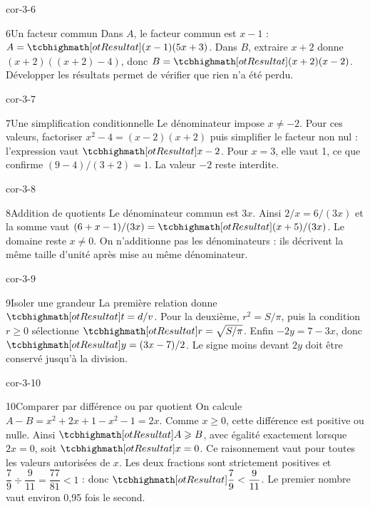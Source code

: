 \begin{blocLivre}{cor-3-6}
\begin{corrige}{6}{Un facteur commun}
Dans $A$, le facteur commun est $x-1$ : $A=\res{(x-1)(5x+3)}$. Dans $B$, extraire $x+2$ donne $(x+2)((x+2)-4)$, donc $B=\res{(x+2)(x-2)}$. Développer les résultats permet de vérifier que rien n’a été perdu.
\end{corrige}
\end{blocLivre}
\begin{blocLivre}{cor-3-7}
\begin{corrige}{7}{Une simplification conditionnelle}
Le dénominateur impose $x\ne-2$. Pour ces valeurs, factoriser $x^2-4=(x-2)(x+2)$ puis simplifier le facteur non nul : l’expression vaut $\res{x-2}$. Pour $x=3$, elle vaut 1, ce que confirme $(9-4)/(3+2)=1$. La valeur $-2$ reste interdite.
\end{corrige}
\end{blocLivre}
\begin{blocLivre}{cor-3-8}
\begin{corrige}{8}{Addition de quotients}
Le dénominateur commun est $3x$. Ainsi $2/x=6/(3x)$ et la somme vaut $(6+x-1)/(3x)=\res{(x+5)/(3x)}$. Le domaine reste $x\ne0$. On n’additionne pas les dénominateurs : ils décrivent la même taille d’unité après mise au même dénominateur.
\end{corrige}
\end{blocLivre}
\begin{blocLivre}{cor-3-9}
\begin{corrige}{9}{Isoler une grandeur}
La première relation donne $\res{t=d/v}$. Pour la deuxième, $r^2=S/\pi$, puis la condition $r\ge0$ sélectionne $\res{r=\sqrt{S/\pi}}$. Enfin $-2y=7-3x$, donc $\res{y=(3x-7)/2}$. Le signe moins devant $2y$ doit être conservé jusqu’à la division.
\end{corrige}
\end{blocLivre}
\begin{blocLivre}{cor-3-10}
\begin{corrige}{10}{Comparer par différence ou par quotient}
On calcule $A-B=x^2+2x+1-x^2-1=2x$. Comme $x\ge0$, cette différence est positive ou nulle. Ainsi $\res{A\ge B}$, avec égalité exactement lorsque $2x=0$, soit $\res{x=0}$. Ce raisonnement vaut pour toutes les valeurs autorisées de $x$. Les deux fractions sont strictement positives et $\dfrac79\div\dfrac9{11}=\dfrac{77}{81}<1$ : donc $\res{\dfrac79<\dfrac9{11}}$. Le premier nombre vaut environ 0,95 fois le second.
\end{corrige}
\end{blocLivre}

